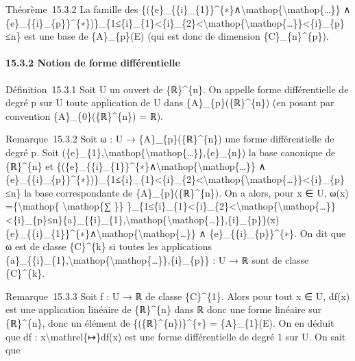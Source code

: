 \documentclass[]{article}
\begin{document}
Théorème~15.3.2 La famille des
\{(\{e\}\_\{\{i\}\_\{1\}\}\^{}\{∗\}∧\textbackslash{}mathop\{\textbackslash{}mathop\{\ldots{}\}\}
∧
\{e\}\_\{\{i\}\_\{p\}\}\^{}\{∗\})\}\_\{1≤\{i\}\_\{1\}\textless{}\{i\}\_\{2\}\textless{}\textbackslash{}mathop\{\textbackslash{}mathop\{\ldots{}\}\}\textless{}\{i\}\_\{p\}≤n\}
est une base de \{A\}\_\{p\}(E) (qui est donc de dimension
\{C\}\_\{n\}\^{}\{p\}).

\paragraph{15.3.2 Notion de forme différentielle}

Définition~15.3.1 Soit U un ouvert de \{ℝ\}\^{}\{n\}. On appelle forme
différentielle de degré p sur U toute application de U dans
\{A\}\_\{p\}(\{ℝ\}\^{}\{n\}) (en posant par convention
\{A\}\_\{0\}(\{ℝ\}\^{}\{n\}) = ℝ).

Remarque~15.3.2 Soit ω : U → \{A\}\_\{p\}(\{ℝ\}\^{}\{n\}) une forme
différentielle de degré p. Soit
(\{e\}\_\{1\},\textbackslash{}mathop\{\textbackslash{}mathop\{\ldots{}\}\},\{e\}\_\{n\})
la base canonique de \{ℝ\}\^{}\{n\} et
\{(\{e\}\_\{\{i\}\_\{1\}\}\^{}\{∗\}∧\textbackslash{}mathop\{\textbackslash{}mathop\{\ldots{}\}\}
∧
\{e\}\_\{\{i\}\_\{p\}\}\^{}\{∗\})\}\_\{1≤\{i\}\_\{1\}\textless{}\{i\}\_\{2\}\textless{}\textbackslash{}mathop\{\textbackslash{}mathop\{\ldots{}\}\}\textless{}\{i\}\_\{p\}≤n\}
la base correspondante de \{A\}\_\{p\}(\{ℝ\}\^{}\{n\}). On a alors, pour
x ∈ U, ω(x) =\{\textbackslash{}mathop\{ \textbackslash{}mathop\{∑ \}\}
\}\_\{1≤\{i\}\_\{1\}\textless{}\{i\}\_\{2\}\textless{}\textbackslash{}mathop\{\textbackslash{}mathop\{\ldots{}\}\}\textless{}\{i\}\_\{p\}≤n\}\{a\}\_\{\{i\}\_\{1\},\textbackslash{}mathop\{\textbackslash{}mathop\{\ldots{}\}\},\{i\}\_\{p\}\}(x)\{e\}\_\{\{i\}\_\{1\}\}\^{}\{∗\}∧\textbackslash{}mathop\{\textbackslash{}mathop\{\ldots{}\}\}
∧ \{e\}\_\{\{i\}\_\{p\}\}\^{}\{∗\}. On dit que ω est de classe
\{C\}\^{}\{k\} si toutes les applications
\{a\}\_\{\{i\}\_\{1\},\textbackslash{}mathop\{\textbackslash{}mathop\{\ldots{}\}\},\{i\}\_\{p\}\}
: U → ℝ sont de classe \{C\}\^{}\{k\}.

Remarque~15.3.3 Soit f : U → ℝ de classe \{C\}\^{}\{1\}. Alors pour tout
x ∈ U, df(x) est une application linéaire de \{ℝ\}\^{}\{n\} dans ℝ donc
une forme linéaire sur \{ℝ\}\^{}\{n\}, donc un élément de
\{(\{ℝ\}\^{}\{n\})\}\^{}\{∗\} = \{A\}\_\{1\}(E). On en déduit que df :
x\textbackslash{}mathrel\{↦\}df(x) est une forme différentielle de degré
1 sur U. On sait que
\end{document}
